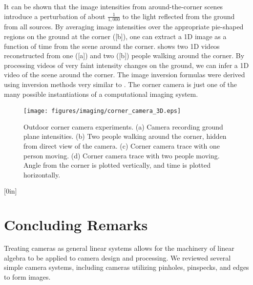 It can be shown \cite{Bouman17} that the image intensities from around-the-corner scenes introduce a perturbation of about $\frac{1}{1,000}$ to the light reflected from the ground from all sources.   
By averaging image intensities over the appropriate pie-shaped regions on the ground at the corner (\fig{\ref{fig:ccmodel}}[b]), one can extract a 1D image as a function of time from the scene around the corner.  \Fig{\ref{fig:cctraces}} shows two 1D videos reconstructed from one (\fig{\ref{fig:cctraces}}[a]) and two (\fig{\ref{fig:cctraces}}[b]) people walking around the corner.  By processing videos of very faint intensity changes on the ground, we can infer a 1D video of the scene around the corner.  The image inversion formulas were derived using inversion methods very similar to \eqn{\ref{eq:deriv2}}.  The corner camera is just one of the many possible instantiations of a computational imaging system.


\begin{figure}[t]
\centerline{
\texttt{[image: figures/imaging/corner\_camera\_3D.eps]}
}
\caption{Outdoor corner camera \cite{Bouman17} experiments. (a) Camera recording ground plane intensities.  (b) Two people walking around the corner, hidden from direct view of the camera. (c) Corner camera trace with one person moving. (d) Corner camera trace with two people moving.  Angle from the corner is plotted vertically, and time is plotted horizontally.}
\label{fig:cctraces}
\end{figure}

[0in]




\section{Concluding Remarks}  
Treating cameras as general linear systems allows for the machinery of linear algebra to be applied to camera design and processing.  We reviewed several simple camera systems, including cameras utilizing pinholes, pinspecks, and edges to form images.
